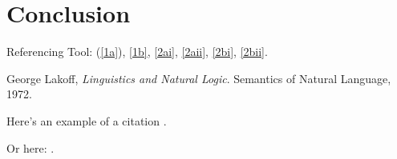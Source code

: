 \documentclass[english, 11pt]{article}
\newcommand{\vs}{\vspace{12pt}}  %
\begin{document}
\section{Conclusion}

\vs

Referencing Tool: (\ref{1a}), \ref{1b}, \ref{2ai}, \ref{2aii}, \ref{2bi}, \ref{2bii}.


\begin{thebibliography}{999}
	George Lakoff,
  	\emph{Linguistics and Natural Logic}.
  	Semantics of Natural Language,
  	1972.
\end{thebibliography}
Here's an example of a citation \citep{lol}.

Or here: \cite{lol}.



\end{document}
